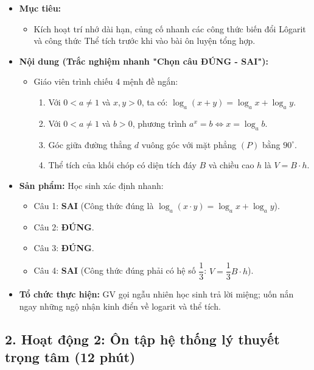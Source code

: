 \documentclass[12pt, a4paper]{article}
\begin{document}
\begin{itemize}[leftmargin=1.2cm]
    \item[a)] \textbf{Mục tiêu:}
    \begin{itemize}[leftmargin=0.6cm]
        \item Kích hoạt trí nhớ dài hạn, củng cố nhanh các công thức biến đổi Lôgarit và công thức Thể tích trước khi vào bài ôn luyện tổng hợp.
    \end{itemize}

    \item[b)] \textbf{Nội dung (Trắc nghiệm nhanh "Chọn câu ĐÚNG - SAI"):}
    \begin{itemize}[leftmargin=0.6cm]
        \item Giáo viên trình chiếu 4 mệnh đề ngắn:
        \begin{enumerate}[leftmargin=0.6cm]
            \item Với $0 < a \ne 1$ và $x, y > 0$, ta có: $\log_a (x + y) = \log_a x + \log_a y$.
            \item Với $0 < a \ne 1$ và $b > 0$, phương trình $a^x = b \iff x = \log_a b$.
            \item Góc giữa đường thẳng $d$ vuông góc với mặt phẳng $(P)$ bằng $90^\circ$.
            \item Thể tích của khối chóp có diện tích đáy $B$ và chiều cao $h$ là $V = B \cdot h$.
        \end{enumerate}
    \end{itemize}

    \item[c)] \textbf{Sản phẩm:} Học sinh xác định nhanh:
    \begin{itemize}[leftmargin=0.6cm]
        \item Câu 1: \textbf{SAI} (Công thức đúng là $\log_a (x \cdot y) = \log_a x + \log_a y$).
        \item Câu 2: \textbf{ĐÚNG}.
        \item Câu 3: \textbf{ĐÚNG}.
        \item Câu 4: \textbf{SAI} (Công thức đúng phải có hệ số $\dfrac{1}{3}$: $V = \dfrac{1}{3} B \cdot h$).
    \end{itemize}

    \item[d)] \textbf{Tổ chức thực hiện:} GV gọi ngẫu nhiên học sinh trả lời miệng; uốn nắn ngay những ngộ nhận kinh điển về logarit và thể tích.
\end{itemize}

\subsection*{2. Hoạt động 2: Ôn tập hệ thống lý thuyết trọng tâm (12 phút)}
\end{document}
